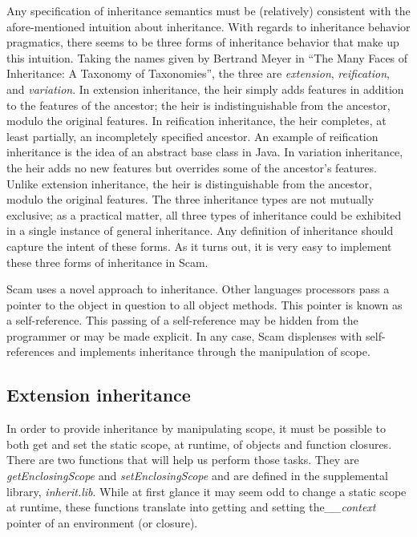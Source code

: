 {{Any specification of inheritance semantics must be (relatively)
consistent with the afore-mentioned intuition about inheritance.
With regards to inheritance behavior pragmatics, there seems to be three
forms of inheritance behavior that make up this intuition.  Taking the
names given by Bertrand Meyer in ``The Many Faces of Inheritance: 
A Taxonomy of Taxonomies'',
the three are {\it extension},
{\it reification}, and {\it variation}.  In extension inheritance,
the heir simply adds features in addition to the features of the
ancestor; the heir is indistinguishable from the ancestor, modulo the
original features.  In reification inheritance, the heir completes,
at least partially, an incompletely specified ancestor.  An example of
reification inheritance is the idea of an abstract base class in Java.
In variation inheritance, the heir adds no new features but overrides
some of the ancestor's features. Unlike extension inheritance, the heir
is distinguishable from the ancestor, modulo the original features. The
three inheritance types are not mutually exclusive; as a practical matter,
all three types of inheritance could be exhibited in a single instance
of general inheritance.  Any definition of inheritance should capture
the intent of these forms.
As it turns out, it is very easy to implement these three forms
of inheritance in Scam.

Scam uses a novel approach to inheritance. Other languages 
processors pass
a pointer to the object in question to all object methods.
This pointer is known as a self-reference. This passing of
a self-reference may be hidden from the programmer or may
be made explicit. In any case, Scam displenses with self-references
and implements inheritance through the manipulation of scope.

\subsection{Extension inheritance}

In order to provide inheritance by manipulating scope, it must be
possible to both get and set the static scope, at runtime, of objects
and function closures.  There are two functions that will help us
perform those tasks. They are
{\it getEnclosingScope} and {\it setEnclosingScope} and are defined
in the supplemental library, {\it inherit.lib}.
While at first
glance it may seem odd to change a static scope at runtime,
these functions translate into getting and setting
the{\it  \_\_context} pointer of an environment (or closure).

}}
